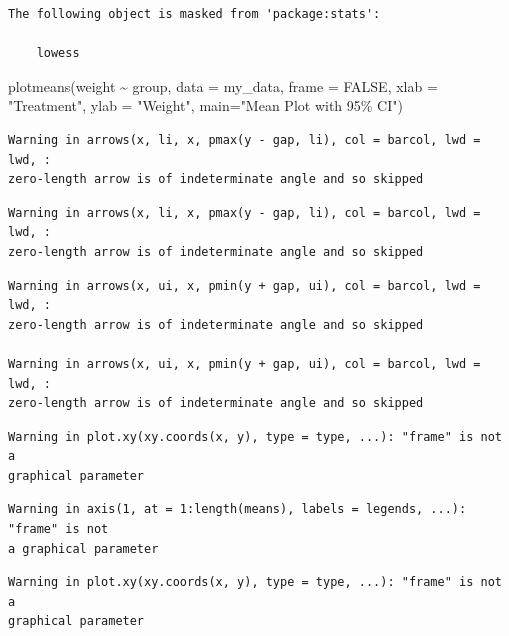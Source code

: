 \documentclass[
  letterpaper,
  DIV=11,
  numbers=noendperiod]{scrartcl}
\newenvironment{Shaded}{\begin{snugshade}}{\end{snugshade}}
\newcommand{\AttributeTok}[1]{\textcolor[rgb]{0.40,0.45,0.13}{#1}}
\newcommand{\ConstantTok}[1]{\textcolor[rgb]{0.56,0.35,0.01}{#1}}
\newcommand{\FunctionTok}[1]{\textcolor[rgb]{0.28,0.35,0.67}{#1}}
\newcommand{\NormalTok}[1]{\textcolor[rgb]{0.00,0.23,0.31}{#1}}
\newcommand{\SpecialCharTok}[1]{\textcolor[rgb]{0.37,0.37,0.37}{#1}}
\newcommand{\StringTok}[1]{\textcolor[rgb]{0.13,0.47,0.30}{#1}}
\begin{document}
\begin{verbatim}
The following object is masked from 'package:stats':

    lowess
\end{verbatim}

\begin{Shaded}
\begin{Highlighting}[]
\FunctionTok{plotmeans}\NormalTok{(weight }\SpecialCharTok{\textasciitilde{}}\NormalTok{ group, }\AttributeTok{data =}\NormalTok{ my\_data, }\AttributeTok{frame =} \ConstantTok{FALSE}\NormalTok{,}
          \AttributeTok{xlab =} \StringTok{"Treatment"}\NormalTok{, }\AttributeTok{ylab =} \StringTok{"Weight"}\NormalTok{,}
          \AttributeTok{main=}\StringTok{"Mean Plot with 95\% CI"}\NormalTok{) }
\end{Highlighting}
\end{Shaded}

\begin{verbatim}
Warning in arrows(x, li, x, pmax(y - gap, li), col = barcol, lwd = lwd, :
zero-length arrow is of indeterminate angle and so skipped
\end{verbatim}

\begin{verbatim}
Warning in arrows(x, li, x, pmax(y - gap, li), col = barcol, lwd = lwd, :
zero-length arrow is of indeterminate angle and so skipped
\end{verbatim}

\begin{verbatim}
Warning in arrows(x, ui, x, pmin(y + gap, ui), col = barcol, lwd = lwd, :
zero-length arrow is of indeterminate angle and so skipped

Warning in arrows(x, ui, x, pmin(y + gap, ui), col = barcol, lwd = lwd, :
zero-length arrow is of indeterminate angle and so skipped
\end{verbatim}

\begin{verbatim}
Warning in plot.xy(xy.coords(x, y), type = type, ...): "frame" is not a
graphical parameter
\end{verbatim}

\begin{verbatim}
Warning in axis(1, at = 1:length(means), labels = legends, ...): "frame" is not
a graphical parameter
\end{verbatim}

\begin{verbatim}
Warning in plot.xy(xy.coords(x, y), type = type, ...): "frame" is not a
graphical parameter
\end{verbatim}
\end{document}
